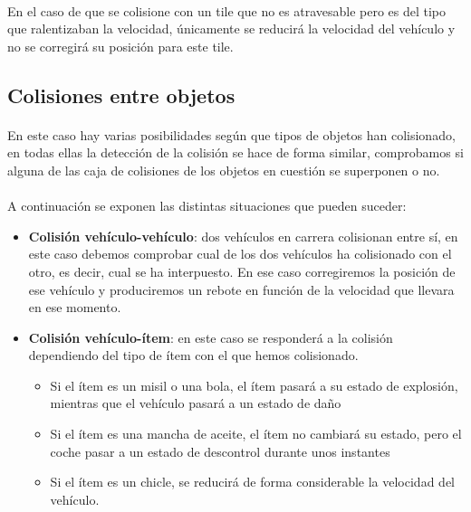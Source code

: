 \paragraph{}
En el caso de que se colisione con un tile que no es atravesable pero es del tipo que ralentizaban la velocidad, únicamente
se reducirá la velocidad del vehículo y no se corregirá su posición para este tile.

\subsection{Colisiones entre objetos}

\paragraph{}
En este caso hay varias posibilidades según que tipos de objetos han colisionado, en todas ellas la detección de la colisión
se hace de forma similar, comprobamos si alguna de las caja de colisiones de los objetos en cuestión se superponen o no.

\paragraph{}
A continuación se exponen las distintas situaciones que pueden suceder:

\begin{itemize}
    \item \textbf{Colisión vehículo-vehículo}: dos vehículos en carrera colisionan entre sí, en este caso debemos comprobar 
    cual de los dos vehículos ha colisionado con el otro, es decir, cual se ha interpuesto. En ese caso 
    corregiremos la posición de ese vehículo y produciremos un rebote en función de la velocidad que llevara
    en ese momento.
    
    \item \textbf{Colisión vehículo-ítem}: en este caso se responderá a la
    colisión dependiendo del tipo de ítem con el que
    hemos colisionado.
    \begin{itemize}
        \item Si el ítem es un misil o una bola, el ítem pasará a su estado de
        explosión, mientras que el vehículo pasará a un estado de daño
        
        \item Si el ítem es una mancha de aceite, el ítem no cambiará su estado, pero el coche pasar a un estado de descontrol durante
        unos instantes
        
        \item Si el ítem es un chicle, se reducirá de forma considerable la velocidad del vehículo.
    \end{itemize}
\end{itemize}

